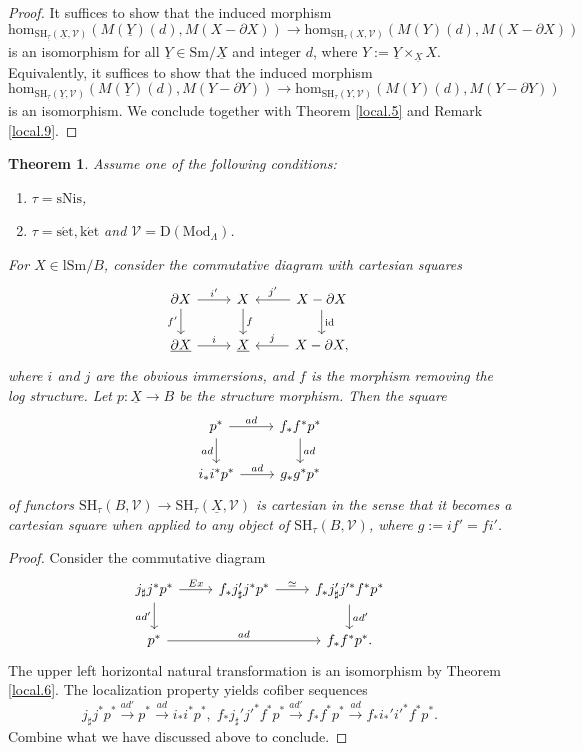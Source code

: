 \documentclass[10pt]{amsart}
\newtheorem{thm}{Theorem}[subsection]
\theoremstyle{definition}
\theoremstyle{remark}
\numberwithin{equation}{subsection}
\newcommand{\cV}{\mathcal{V}}
\newcommand{\id}{\mathrm{id}}
\newcommand{\ul}{\underline}
\newcommand{\Sm}{\mathrm{Sm}}
\newcommand{\SH}{\mathrm{SH}}
\newcommand{\map}{\mathrm{hom}}
\newcommand{\DLambda}{\mathrm{D}(\mathrm{Mod}_{\Lambda})}
\newcommand{\lSm}{\mathrm{lSm}}
\newcommand{\sNis}{\mathrm{sNis}}
\newcommand{\ketale}{\mathrm{k\acute{e}t}}
\newcommand{\setale}{\mathrm{s\acute{e}t}}
\begin{document}
\begin{proof}
It suffices to show that the induced morphism
\[
\map_{\SH_{\ul{\tau}}(\ul{X},\cV)}
(M(\ul{Y})(d),M(X-\partial X))
\to
\map_{\SH_{\tau}(X,\cV)}
(M(Y)(d),M(X-\partial X))
\]
is an isomorphism for all $\ul{Y}\in \Sm/\ul{X}$ and integer $d$, where $Y:=\ul{Y}\times_{\ul{X}}X$.
Equivalently, it suffices to show that the induced morphism
\[
\map_{\SH_{\ul{\tau}}(\ul{Y},\cV)}
(M(\ul{Y})(d),M(Y-\partial Y))
\to
\map_{\SH_{\tau}(Y,\cV)}
(M(Y)(d),M(Y-\partial Y))
\]
is an isomorphism.
We conclude together with Theorem \ref{local.5} and Remark \ref{local.9}.
\end{proof}









\begin{thm}
\label{local.8}
Assume one of the following conditions:
\begin{enumerate}
\item[\textup{(i)}]
$\tau=\sNis$,
\item[\textup{(ii)}]
$\tau=\setale,\ketale$ and $\cV=\DLambda$.
\end{enumerate}
For $X\in \lSm/B$,
consider the commutative diagram with cartesian squares
\[
\begin{tikzcd}
\partial X\ar[r,"i'"]\ar[d,"f'"']&
X\ar[d,"f"]\ar[r,leftarrow,"j'"]&
X-\partial X\ar[d,"\id"]
\\
\ul{\partial X}\ar[r,"i"]&
\ul{X}\ar[r,leftarrow,"j"]&
X-\partial X,
\end{tikzcd}
\]
where $i$ and $j$ are the obvious immersions, and $f$ is the morphism removing the log structure.
Let $p\colon \ul{X}\to B$ be the structure morphism.
Then the square
\[
\begin{tikzcd}
p^* \ar[r,"ad"]\ar[d,"ad"']&
f_*f^*p^*\ar[d,"ad"]
\\
i_*i^*p^*\ar[r,"ad"]&
g_*g^*p^*
\end{tikzcd}
\]
of functors $\SH_{\tau}(B,\cV)\to \SH_{\tau}(\ul{X},\cV)$ is cartesian in the sense that it becomes a cartesian square when applied to any object of $\SH_{\tau}(B,\cV)$, where $g:=if'=fi'$.
\end{thm}
\begin{proof}
Consider the commutative diagram
\[
\begin{tikzcd}
j_\sharp j^*p^*\ar[r,"Ex"]\ar[d,"ad'"']&
f_* j_\sharp' j^*p^*\ar[r,"\simeq"]&
f_*j_\sharp' j'^* f^*p^*\ar[d,"ad'"]
\\
p^*\ar[rr,"ad"]&
&
f_*f^*p^*.
\end{tikzcd}
\]
The upper left horizontal natural transformation is an isomorphism by Theorem \ref{local.6}.
The localization property yields cofiber sequences
\[
j_\sharp j^*p^*
\xrightarrow{ad'}
p^*
\xrightarrow{ad}
i_*i^*p^*,
\;
f_*j_\sharp'j'^*f^*p^*
\xrightarrow{ad'}
f_*f^*p^*
\xrightarrow{ad}
f_*i_*'i'^*f^*p^*.
\]
Combine what we have discussed above to conclude.
\end{proof}
\end{document}
